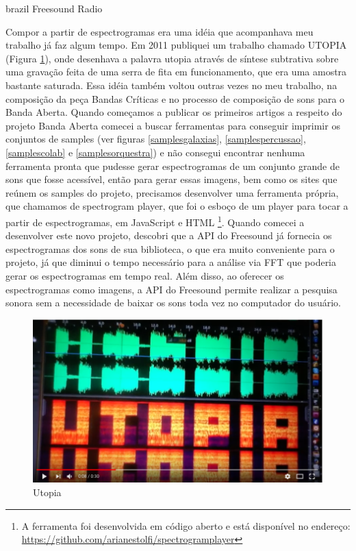 \begin{otherlanguage*}{brazil}
Freesound Radio


Compor a partir de espectrogramas era uma idéia que acompanhava meu trabalho já faz algum tempo. Em 2011 publiquei um trabalho chamado UTOPIA (Figura \ref{utopia}), onde desenhava a palavra utopia através de síntese subtrativa sobre uma gravação feita de uma serra de fita em funcionamento, que era uma amostra bastante saturada. Essa idéia também voltou outras vezes no meu trabalho, na composição da peça Bandas Críticas e no processo de composição de sons para o Banda Aberta. Quando começamos a publicar os primeiros artigos a respeito do projeto Banda Aberta comecei a buscar ferramentas para conseguir imprimir os conjuntos de samples (ver figuras \ref{samplesgalaxias}, \ref{samplespercussao}, \ref{samplescolab} e \ref{samplesorquestra}) e não consegui encontrar nenhuma ferramenta pronta que pudesse gerar espectrogramas de um conjunto grande de sons que fosse acessível, então para gerar essas imagens, bem como os sites que reúnem os samples do projeto, precisamos desenvolver uma ferramenta própria, que chamamos de spectrogram player, que foi o esboço de um player para tocar a partir de espectrogramas, em JavaScript e HTML \footnote{A ferramenta foi desenvolvida em código aberto e está disponível no endereço: \url{https://github.com/arianestolfi/spectrogramplayer}}. Quando comecei a desenvolver este novo projeto, descobri que a API do Freesound já fornecia os espectrogramas dos sons de sua biblioteca, o que era muito conveniente para o projeto, já que diminui o tempo necessário para a análise via FFT que poderia gerar os espectrogramas em tempo real. Além disso, ao oferecer os espectrogramas como imagens, a API do Freesound permite realizar a pesquisa sonora sem a necessidade de baixar os sons toda vez no computador do usuário.

\begin{figure}
\centering
\includegraphics[width=1\textwidth]{pictures/cap4/utopia}
\caption{\label{pstimeline}Utopia }
\label{utopia}
\end{figure}


\end{otherlanguage*}
